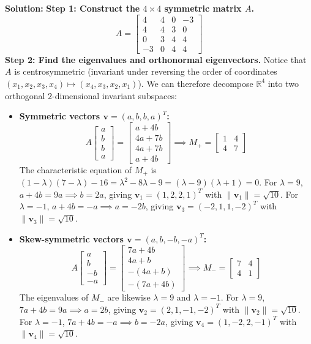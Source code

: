 \documentclass[11pt, letterpaper]{article}
\theoremstyle{definition}
\theoremstyle{remark}
\begin{document}
\textbf{Solution:}
\textbf{Step 1: Construct the $4 \times 4$ symmetric matrix $A$.}
\[
A = \begin{bmatrix} 4 & 4 & 0 & -3 \\ 4 & 4 & 3 & 0 \\ 0 & 3 & 4 & 4 \\ -3 & 0 & 4 & 4 \end{bmatrix}
\]
\textbf{Step 2: Find the eigenvalues and orthonormal eigenvectors.}
Notice that $A$ is centrosymmetric (invariant under reversing the order of coordinates $(x_1, x_2, x_3, x_4) \mapsto (x_4, x_3, x_2, x_1)$). We can therefore decompose $\mathbb{R}^4$ into two orthogonal $2$-dimensional invariant subspaces:
\begin{itemize}
    \item \textbf{Symmetric vectors $\mathbf{v} = (a, b, b, a)^T$:}
    \[
    A \begin{bmatrix} a \\ b \\ b \\ a \end{bmatrix} = \begin{bmatrix} a + 4b \\ 4a + 7b \\ 4a + 7b \\ a + 4b \end{bmatrix} \implies M_+ = \begin{bmatrix} 1 & 4 \\ 4 & 7 \end{bmatrix}
    \]
    The characteristic equation of $M_+$ is $(1-\lambda)(7-\lambda) - 16 = \lambda^2 - 8\lambda - 9 = (\lambda - 9)(\lambda + 1) = 0$.
    For $\lambda = 9$, $a + 4b = 9a \implies b = 2a$, giving $\mathbf{v}_1 = (1, 2, 2, 1)^T$ with $\|\mathbf{v}_1\| = \sqrt{10}$.
    For $\lambda = -1$, $a + 4b = -a \implies a = -2b$, giving $\mathbf{v}_3 = (-2, 1, 1, -2)^T$ with $\|\mathbf{v}_3\| = \sqrt{10}$.
    
    \item \textbf{Skew-symmetric vectors $\mathbf{v} = (a, b, -b, -a)^T$:}
    \[
    A \begin{bmatrix} a \\ b \\ -b \\ -a \end{bmatrix} = \begin{bmatrix} 7a + 4b \\ 4a + b \\ -(4a + b) \\ -(7a + 4b) \end{bmatrix} \implies M_- = \begin{bmatrix} 7 & 4 \\ 4 & 1 \end{bmatrix}
    \]
    The eigenvalues of $M_-$ are likewise $\lambda = 9$ and $\lambda = -1$.
    For $\lambda = 9$, $7a + 4b = 9a \implies a = 2b$, giving $\mathbf{v}_2 = (2, 1, -1, -2)^T$ with $\|\mathbf{v}_2\| = \sqrt{10}$.
    For $\lambda = -1$, $7a + 4b = -a \implies b = -2a$, giving $\mathbf{v}_4 = (1, -2, 2, -1)^T$ with $\|\mathbf{v}_4\| = \sqrt{10}$.
\end{itemize}
\end{document}
